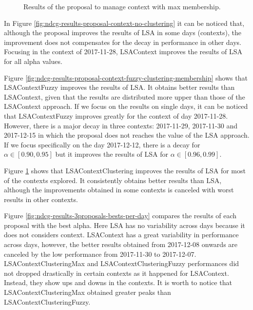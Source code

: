 \documentclass[preprint]{elsarticle}
\begin{document}
\begin{spacing}{1.5}
\begin{figure}[htb]
    \caption{Results of the proposal to manage context with max membership.}
    \label{fig:ndcg-results-proposal-context-fuzzy-clustering-max}
\end{figure}

In Figure \ref{fig:ndcg-results-proposal-context-no-clustering} it can be noticed that, although the proposal improves the results of LSA in some days (contexts), the improvement does not compensates for the decay in performance in other days. Focusing in the context of 2017-11-28, LSAContext improves the results of LSA for all alpha values.

Figure \ref{fig:ndcg-results-proposal-context-fuzzy-clustering-membership} shows that LSAContextFuzzy improves the results of LSA. It obtains better results than LSAContext, given that the results are distributed more upper than those of the LSAContext approach. If we focus on the results on single days, it can be noticed that LSAContextFuzzy improves greatly for the context of day 2017-11-28. However, there is a major decay in three contexts: 2017-11-29, 2017-11-30 and 2017-12-15 in which the proposal does not reaches the value of the LSA approach. If we focus specifically on the day 2017-12-12, there is a decay for $\alpha \in [0.90,0.95]$ but it improves the results of LSA for $\alpha \in [0.96,0.99]$.

Figure \ref{fig:ndcg-results-proposal-context-fuzzy-clustering-max} shows that LSAContextClustering improves the results of LSA for most of the contexts explored. It consistently obtains better results than LSA, although the improvements obtained in some contexts is canceled with worst results in other contexts.


Figure \ref{fig:ndcg-results-3proposals-bests-per-day} compares the results of each proposal with the best alpha. Here LSA has no variability across days because it does not considers context. LSAContext has a great variability in performance across days, however, the better results obtained from 2017-12-08 onwards are canceled by the low performance from 2017-11-30 to 2017-12-07. LSAContextClusteringMax and LSAContextClusteringFuzzy performances did not dropped drastically in certain contexts as it happened for LSAContext. Instead, they show ups and downs in the contexts. It is worth to notice that LSAContextClusteringMax obtained greater peaks than LSAContextClusteringFuzzy.


\end{spacing}
\end{document}
